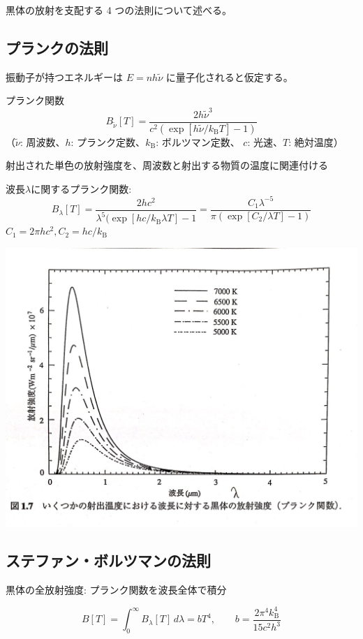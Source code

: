 \documentclass[article]{dennou777}
\begin{document}
黒体の放射を支配する 4 つの法則について述べる。

\subsection{プランクの法則}
振動子が持つエネルギーは $E=nh\tilde{\nu}$ に量子化されると仮定する。

プランク関数
\begin{equation}
	B_{\tilde{\nu}}[T]=\frac{2h\tilde{\nu}^3}{c^2(\exp[h\tilde{\nu}/k_\mathrm{B}T]-1)}
\end{equation}
（$\tilde{\nu}$: 周波数、$h$: プランク定数、$k_\mathrm{B}$: ボルツマン定数、
$c$: 光速、$T$: 絶対温度）

射出された単色の放射強度を、周波数と射出する物質の温度に関連付ける

波長$\lambda$に関するプランク関数:
\begin{equation}
	B_\lambda[T]=\frac{2hc^2}{\lambda^5(\exp[hc/k_\mathrm{B}\lambda T]-1}=
	\frac{C_1\lambda^{-5}}{\pi(\exp[C_2/\lambda T]-1)}
\end{equation}
$C_1=2\pi hc^2, C_2=hc/k_\mathrm{B}$

\includegraphics[width=\textwidth]{planck.jpg}

\subsection{ステファン・ボルツマンの法則}
黒体の全放射強度: プランク関数を波長全体で積分

\begin{equation}
	B[T]=\int^\infty_0 B_\lambda[T]\,d\lambda=bT^4,
	\qquad b=\frac{2\pi^4k_\mathrm{B}^4}{15c^2h^3}
\end{equation}
\end{document}
